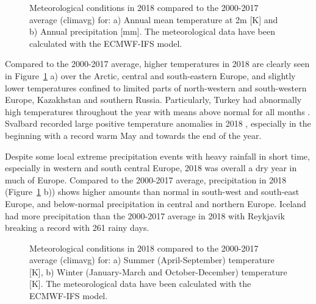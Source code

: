 \begin{figure}[h]
  \centering
  \caption{Meteorological conditions in 2018 compared to the 2000-2017 average (climavg) for: a) Annual mean temperature at 2m [K] and b) Annual precipitation [mm]. The meteorological data have been calculated with the ECMWF-IFS model.}
\label{fig:2018-avMET}
\end{figure}

Compared to the 2000-2017 average, higher temperatures in 2018 are clearly seen in Figure~\ref{fig:2018-avMET} a) over the Arctic, central and south-eastern Europe, and slightly lower temperatures 
confined to limited parts of north-western and south-western Europe, Kazakhstan and southern Russia. Particularly, Turkey had abnormally high temperatures throughout the year with means above normal for all months \citep{Sensoy:Turkey2018}.
Svalbard recorded large positive temperature anomalies in 2018 \citep{Overland:ARC2018}, especially in the beginning with a record warm May and towards the end of the year.

Despite some local extreme precipitation events with heavy rainfall in short time, especially in western and south central Europe, 2018 was overall a dry year in much of Europe. Compared to the 2000-2017 average, precipitation in 2018  (Figure~\ref{fig:2018-avMET} b)) shows higher amounts than normal in south-west and south-east Europe, and below-normal precipitation in central and northern Europe. Iceland had more precipitation than the 2000-2017 average in 2018 with Reykjavik breaking a record with 261 rainy days.

\begin{figure}[h]
  \centering 
  \caption{Meteorological conditions in 2018 compared to the 2000-2017 average (climavg) for: a) Summer (April-September) temperature [K], b) Winter (January-March and October-December) temperature [K]. The meteorological data have been calculated with the ECMWF-IFS model.} 
\label{fig:temp2018-avMET}
\end{figure}

